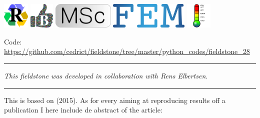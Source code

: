 \includegraphics[height=1.25cm]{images/pictograms/replication}
\includegraphics[height=1.25cm]{images/pictograms/benchmark}
\includegraphics[height=1.25cm]{images/pictograms/msc}
\includegraphics[height=1.25cm]{images/pictograms/FEM}
\includegraphics[height=1.25cm]{images/pictograms/temperature}




\begin{center}
\inpython
{\small Code: \url{https://github.com/cedrict/fieldstone/tree/master/python_codes/fieldstone_28}}
\end{center}

\par\noindent\rule{\textwidth}{0.4pt}

{\sl This fieldstone was developed in collaboration with Rens Elbertsen}. 

\par\noindent\rule{\textwidth}{0.4pt}

This \stone is based on \textcite{tosn15} (2015).
As for every \stone aiming at reproducing results off a publication I here include de abstract
of the article:

